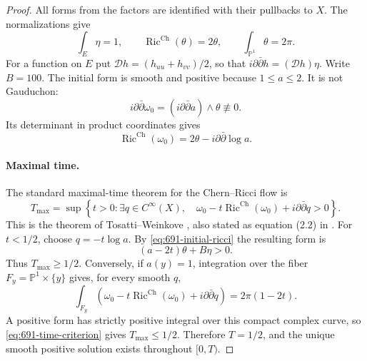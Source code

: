 \documentclass[11pt,a4paper]{article}
\theoremstyle{remark}
\begin{document}
\begin{proof}
All forms from the factors are identified with their pullbacks to $X$. The normalizations give
\[
 \int_E\eta=1,\qquad
 \operatorname{Ric}^{\mathrm{Ch}}(\theta)=2\theta,\qquad
 \int_{\mathbb P^1}\theta=2\pi.
\]
For a function on $E$ put $\mathcal D h=(h_{uu}+h_{vv})/2$, so that
$i\partial\bar\partial h=(\mathcal D h)\eta$. Write $B=100$.
The initial form is smooth and positive because $1\le a\le2$. It is not Gauduchon:
\[
 i\partial\bar\partial\omega_0
 =(i\partial\bar\partial a)\wedge\theta\not\equiv0.
\]
Its determinant in product coordinates gives
\begin{equation}
 \operatorname{Ric}^{\mathrm{Ch}}(\omega_0)
 =2\theta-i\partial\bar\partial\log a.
 \label{eq:691-initial-ricci}
\end{equation}

\paragraph{Maximal time.}
The standard maximal-time theorem for the Chern--Ricci flow is
\begin{equation}
 T_{\max}=\sup\left\{t>0:\exists q\in C^\infty(X),\quad
 \omega_0-t\operatorname{Ric}^{\mathrm{Ch}}(\omega_0)
       +i\partial\bar\partial q>0\right\}.
 \label{eq:691-time-criterion}
\end{equation}
This is the theorem of Tosatti--Weinkove \cite{TosattiWeinkove2015}, also stated as equation (2.2) in \cite{TosattiWeinkove2022}. For $t<1/2$, choose $q=-t\log a$. By \eqref{eq:691-initial-ricci} the resulting form is
\[
 (a-2t)\theta+B\eta>0.
\]
Thus $T_{\max}\ge1/2$. Conversely, if $a(y)=1$, integration over the fiber
$F_y=\mathbb P^1\times\{y\}$ gives, for every smooth $q$,
\[
 \int_{F_y}\left(\omega_0-t\operatorname{Ric}^{\mathrm{Ch}}(\omega_0)
                  +i\partial\bar\partial q\right)=2\pi(1-2t).
\]
A positive form has strictly positive integral over this compact complex curve, so \eqref{eq:691-time-criterion} gives $T_{\max}\le1/2$. Therefore $T=1/2$, and the unique smooth positive solution exists throughout $[0,T)$.


\end{proof}
\end{document}
